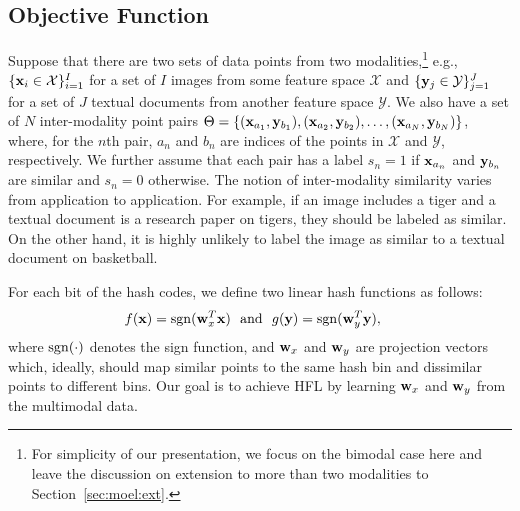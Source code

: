 \subsection{Objective Function}

Suppose that there are two sets of data points from two modalities,\footnote{For simplicity of our presentation, we focus on the bimodal case here and leave the discussion on extension to more than two modalities to Section~\ref{sec:moel:ext}.}
e.g., $\{{\bf x}_{i}\in\mathcal{X}\}_{i=1}^{I}$ for a set of $I$ images from some feature space $\mathcal{X}$ and $\{{\bf y}_{j}\in\mathcal{Y}\}_{j=1}^{J}$ for a set of $J$ textual documents from another feature space $\mathcal{Y}$. We also have a set of $N$ inter-modality point pairs $\Theta = \{({\bf x}_{a_1},{\bf y}_{b_1}), ({\bf x}_{a_2},{\bf y}_{b_2}),\dots, ({\bf x}_{a_N},{\bf y}_{b_N})\}$, where, for the $n$th pair, ${a_n}$ and $b_{n}$ are indices of the points in $\mathcal{X}$ and $\mathcal{Y}$, respectively. We further assume that each pair has a label $s_{n} = 1$ if ${\bf x}_{a_n}$ and ${\bf y}_{b_n}$ are similar and $s_{n}=0$ otherwise.  The notion of inter-modality similarity varies from application to application.  For example, if an image includes a tiger and a textual document is a research paper on tigers, they should be labeled as similar.  On the other hand, it is highly unlikely to label the image as similar to a textual document on basketball.

For each bit of the hash codes, we define two linear hash functions as follows:
\begin{align}
f({\bf x} ) = \mathop{\rm sgn}({\bf w}_{x}^{T}{\bf x}) \ \ \mbox{and} \ \ g({\bf y} ) &= \mathop{\rm sgn}({\bf w}_{y}^{T}{\bf y}),\nonumber
\end{align}
where $\mathop{\rm sgn}(\cdot)$ denotes the sign function, and ${\bf w}_{x}$ and ${\bf w}_{y}$ are projection vectors which, ideally, should map similar points to the same hash bin and dissimilar points to different bins.  Our goal is to achieve \mbox{HFL} by learning ${\bf w}_{x}$ and ${\bf w}_{y}$ from the multimodal data.


